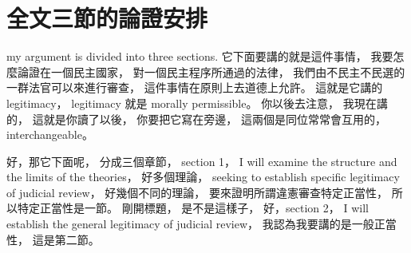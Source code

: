 \section{全文三節的論證安排}

\hypertarget{w02:cue:770}{}my argument is divided into three sections.
\hypertarget{w02:cue:771}{}它下面要講的就是這件事情，
\hypertarget{w02:cue:772}{}我要怎麼論證在一個民主國家，
\hypertarget{w02:cue:773}{}對一個民主程序所通過的法律，
\hypertarget{w02:cue:774}{}我們由不民主不民選的一群法官可以來進行審查，
\hypertarget{w02:cue:775}{}這件事情在原則上去道德上允許。
\hypertarget{w02:cue:776}{}這就是它講的 legitimacy，
\hypertarget{w02:cue:777}{}legitimacy 就是 morally permissible。
\hypertarget{w02:cue:778}{}你以後去注意，
\hypertarget{w02:cue:779}{}我現在講的，
\hypertarget{w02:cue:780}{}這就是你讀了以後，
\hypertarget{w02:cue:781}{}你要把它寫在旁邊，
\hypertarget{w02:cue:782}{}這兩個是同位常常會互用的，
\hypertarget{w02:cue:783}{}interchangeable。

\hypertarget{w02:cue:784}{}好，那它下面呢，
\hypertarget{w02:cue:785}{}分成三個章節，
\hypertarget{w02:cue:786}{}section 1，
\hypertarget{w02:cue:787}{}I will examine the structure and the limits of the theories，
\hypertarget{w02:cue:788}{}好多個理論，
\hypertarget{w02:cue:789}{}seeking to establish specific legitimacy of judicial review，
\hypertarget{w02:cue:790}{}好幾個不同的理論，
\hypertarget{w02:cue:791}{}要來證明所謂違憲審查特定正當性，
\hypertarget{w02:cue:792}{}所以特定正當性是一節。
\hypertarget{w02:cue:793}{}剛開標題，
\hypertarget{w02:cue:794}{}是不是這樣子，
\hypertarget{w02:cue:795}{}好，section 2，
\hypertarget{w02:cue:796}{}I will establish the general legitimacy of judicial review，
\hypertarget{w02:cue:797}{}我認為我要講的是一般正當性，
\hypertarget{w02:cue:798}{}這是第二節。

